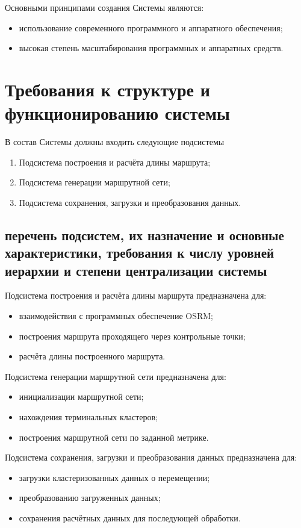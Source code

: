 Основными принципами создания Системы являются:
\begin{itemize}
    \item использование современного программного и аппаратного обеспечения;
    \item высокая степень масштабирования программных и аппаратных средств.
\end{itemize}

\section{Требования к структуре и функционированию системы}
В состав Системы должны входить следующие подсистемы
\begin{enumerate}
    \item Подсистема построения и расчёта длины маршрута;
    \item Подсистема генерации маршрутной сети;
    \item Подсистема сохранения, загрузки и преобразования данных.
\end{enumerate}

\subsection{перечень подсистем, их назначение и основные характеристики, требования к числу уровней 
    иерархии и степени централизации системы}
Подсистема построения и расчёта длины маршрута предназначена для:
\begin{itemize}
    \item взаимодействия с программных обеспечение OSRM;
    \item построения маршрута проходящего через контрольные точки;
    \item расчёта длины построенного маршрута.
\end{itemize}

Подсистема генерации маршрутной сети предназначена для:
\begin{itemize}
    \item инициализации маршрутной сети;
    \item нахождения терминальных кластеров;
    \item построения маршрутной сети по заданной метрике.
\end{itemize}

Подсистема сохранения, загрузки и преобразования данных предназначена для:
\begin{itemize}
    \item загрузки кластеризованных данных о перемещении;
    \item преобразованию загруженных данных;
    \item сохранения расчётных данных для последующей обработки.
\end{itemize}

